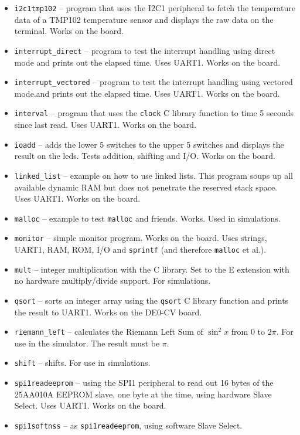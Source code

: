 \documentclass[12pt]{article}
\begin{document}
\begin{itemize}
\item \lstinline|i2c1tmp102| -- program that uses the I2C1 peripheral to fetch the temperature data of a TMP102 temperature sensor and displays the raw data on the terminal. Works on the board.
\item \lstinline|interrupt_direct| -- program to test the interrupt handling using direct mode and prints out the elapsed time. Uses UART1. Works on the board.
\item \lstinline|interrupt_vectored| -- program to test the interrupt handling using vectored mode.and prints out the elapsed time. Uses UART1. Works on the board.
\item \lstinline|interval| -- program that uses the \lstinline|clock| C library function to time 5 seconds since last read. Uses UART1. Works on the board.
\item \lstinline|ioadd| -- adds the lower 5 switches to the upper 5 switches and displays the result on the leds. Tests addition, shifting and I/O. Works on the board.
\item \lstinline|linked_list| -- example on how to use linked lists. This program soups up all available dynamic RAM but does not penetrate the reserved stack space. Uses UART1. Works on the board.
\item \lstinline|malloc| -- example to test \lstinline|malloc| and friends. Works. Used in simulations.
\item \lstinline|monitor| -- simple monitor program. Works on the board. Uses strings, UART1, RAM, ROM, I/O and \lstinline|sprintf| (and therefore \lstinline|malloc| et al.).
\item \lstinline|mult| -- integer multiplication with the C library. Set to the E extension with no hardware multiply/divide support. For simulations.
\item \lstinline|qsort| -- sorts an integer array using the \lstinline|qsort| C library function and prints the result to UART1. Works on the DE0-CV board.
\item \lstinline|riemann_left| -- calculates the Riemann Left Sum of $\sin^2 x$ from $0$ to $2\pi$. For use in the simulator. The  result must be $\pi$.
\item \lstinline|shift| -- shifts. For use in simulations.
\item \lstinline|spi1readeeprom| -- using the SPI1 peripheral to read out 16 bytes of the 25AA010A EEPROM slave, one byte at the time, using hardware Slave Select. Uses UART1. Works on the board.
\item \lstinline|spi1softnss| -- as \lstinline|spi1readeeprom|, using software Slave Select.

\end{itemize}
\end{document}
